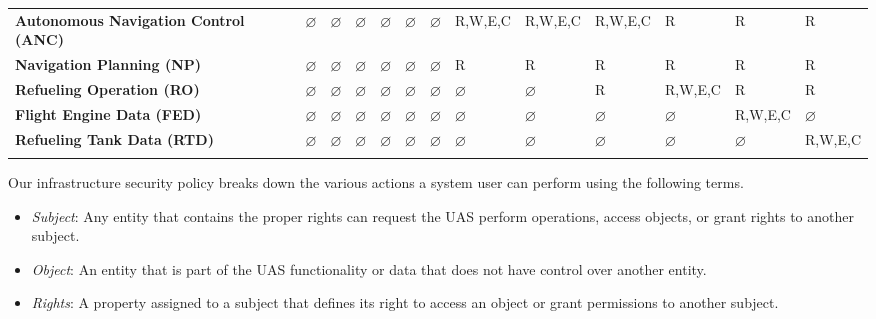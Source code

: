 \documentclass[10pt,journal,compsoc]{IEEEtran}
\begin{document}
\begin{table*}[]
{\begin{tabular}{lllllllllllll}
    \multicolumn{1}{l|}{\textbf{Autonomous Navigation Control (ANC)}} & $\varnothing$ & $\varnothing$ & $\varnothing$ & $\varnothing$ & $\varnothing$ & $\varnothing$ & R,W,E,C       & R,W,E,C       & R,W,E,C       & R             & R             & R             \\
    \multicolumn{1}{l|}{\textbf{Navigation Planning (NP)}}            & $\varnothing$ & $\varnothing$ & $\varnothing$ & $\varnothing$ & $\varnothing$ & $\varnothing$ & R             & R             & R             & R             & R             & R             \\
    \multicolumn{1}{l|}{\textbf{Refueling Operation (RO)}}            & $\varnothing$ & $\varnothing$ & $\varnothing$ & $\varnothing$ & $\varnothing$ & $\varnothing$ & $\varnothing$ & $\varnothing$ & R             & R,W,E,C       & R             & R             \\
    \multicolumn{1}{l|}{\textbf{Flight Engine Data (FED)}}            & $\varnothing$ & $\varnothing$ & $\varnothing$ & $\varnothing$ & $\varnothing$ & $\varnothing$ & $\varnothing$ & $\varnothing$ & $\varnothing$ & $\varnothing$ & R,W,E,C       & $\varnothing$ \\
    \multicolumn{1}{l|}{\textbf{Refueling Tank Data (RTD)}}           & $\varnothing$ & $\varnothing$ & $\varnothing$ & $\varnothing$ & $\varnothing$ & $\varnothing$ & $\varnothing$ & $\varnothing$ & $\varnothing$ & $\varnothing$ & $\varnothing$ & R,W,E,C       \\
                                                                      &               &               &               &               &               &               &               &               &               &               &               &              
  \end{tabular}}
  \end{table*}

Our infrastructure security policy breaks down the various actions a system user can perform using the following terms. 

\begin{itemize}
  \item \textit{Subject}: Any entity that contains the proper rights can request the UAS perform operations, access objects, or grant rights to another subject.
  \item \textit{Object}: An entity that is part of the UAS functionality or data that does not have control over another entity. 
  \item \textit{Rights}: A property assigned to a subject that defines its right to access an object or grant permissions to another subject.
\end{itemize}
\end{document}
